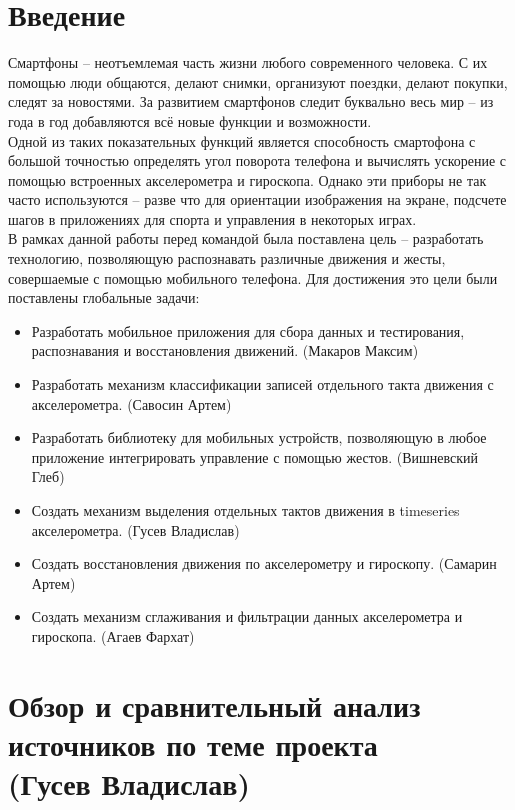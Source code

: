 \section{Введение}

Смартфоны -- неотъемлемая часть жизни любого современного человека. С их помощью люди общаются, делают снимки, организуют поездки, делают покупки, следят за новостями. За развитием смартфонов следит буквально весь мир -- из года в год добавляются всё новые функции и возможности. \\

Одной из таких показательных функций является способность смартофона с большой точностью определять угол поворота телефона и вычислять ускорение с помощью встроенных акселерометра и гироскопа. Однако эти приборы не так часто используются -- разве что для ориентации изображения на экране, подсчете шагов в приложениях для спорта и управления в некоторых играх. \\

В рамках данной работы перед командой была поставлена цель -- разработать технологию, позволяющую распознавать различные движения и жесты, совершаемые с помощью мобильного телефона. Для достижения это цели были поставлены глобальные задачи:

\begin{itemize}
    \item Разработать мобильное приложения для сбора данных и тестирования, распознавания и восстановления движений. (Макаров Максим) 
    \item Разработать механизм классификации записей отдельного такта движения с акселерометра. (Савосин Артем)
    \item Разработать библиотеку для мобильных устройств, позволяющую в любое приложение интегрировать управление с помощью жестов. (Вишневский Глеб)
    \item Создать механизм выделения отдельных тактов движения в timeseries акселерометра. (Гусев Владислав)
    \item Создать восстановления движения по акселерометру и гироскопу. (Самарин Артем)
    \item Создать механизм сглаживания и фильтрации данных акселерометра и гироскопа. (Агаев Фархат)
\end{itemize}

\section{Обзор и сравнительный анализ источников по теме проекта \\ (Гусев Владислав)}

